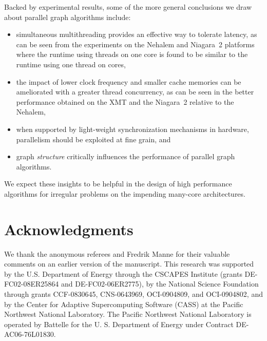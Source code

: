 \documentclass{article}
\begin{document}
Backed by experimental results, some of the more general conclusions we draw about
parallel graph algorithms include:
\begin{itemize}
\item simultaneous multithreading provides an effective way to tolerate latency, as can be seen from  
the experiments on the Nehalem and Niagara~2 platforms where the runtime 
using  threads on one core is found to be similar to the runtime using one thread on  cores, 
\item the impact of lower clock frequency and smaller cache memories can be ameliorated with a greater thread concurrency, 
as can be seen in the better performance obtained on the XMT and the Niagara~2 relative to the Nehalem,
\item when supported by light-weight synchronization mechanisms in hardware, 
parallelism should be exploited at fine grain, and
\item graph {\em structure} critically influences the performance of parallel graph algorithms.
\end{itemize}
We expect these insights to be helpful in the design of high performance algorithms for
irregular problems on the impending many-core architectures. 

\section*{Acknowledgments}
We thank the anonymous referees and Fredrik Manne for their valuable 
comments on an earlier version of the manuscript. This research was supported by the 
U.S. Department of Energy through the CSCAPES Institute (grants
DE-FC02-08ER25864 and DE-FC02-06ER2775), by the National Science
Foundation through grants CCF-0830645, CNS-0643969, OCI-0904809,
and OCI-0904802, and by the Center for Adaptive Supercomputing
Software (CASS) at the Pacific Northwest National Laboratory. The
Pacific Northwest National Laboratory is operated by Battelle for the
U. S. Department of Energy under Contract DE-AC06-76L01830.



\end{document}
